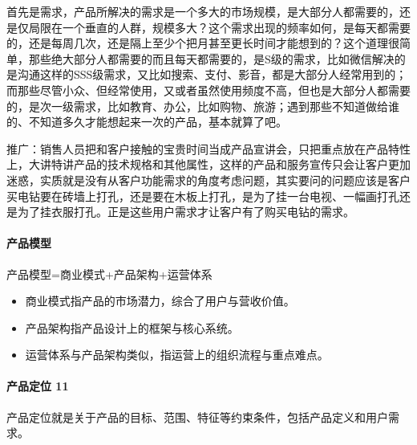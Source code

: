 \documentclass[letterpaper,10pt,english]{sphinxmanual}
\begin{document}
首先是需求，产品所解决的需求是一个多大的市场规模，是大部分人都需要的，还是仅局限在一个垂直的人群，规模多大？这个需求出现的频率如何，是每天都需要的，还是每周几次，还是隔上至少个把月甚至更长时间才能想到的？这个道理很简单，那些绝大部分人都需要的而且每天都需要的，是S级的需求，比如微信解决的是沟通这样的SSS级需求，又比如搜索、支付、影音，都是大部分人经常用到的；而那些尽管小众、但经常使用，又或者虽然使用频度不高，但也是大部分人都需要的，是次一级需求，比如教育、办公，比如购物、旅游；遇到那些不知道做给谁的、不知道多久才能想起来一次的产品，基本就算了吧。

推广：销售人员把和客户接触的宝贵时间当成产品宣讲会，只把重点放在产品特性上，大讲特讲产品的技术规格和其他属性，这样的产品和服务宣传只会让客户更加迷惑，实质就是没有从客户功能需求的角度考虑问题，其实要问的问题应该是客户买电钻要在砖墙上打孔，还是要在木板上打孔，是为了挂一台电视、一幅画打孔还是为了挂衣服打孔。正是这些用户需求才让客户有了购买电钻的需求。


\paragraph{产品模型}
\label{\detokenize{chapter_introduction/Product:id46}}
产品模型=商业模式+产品架构+运营体系%
\begin{footnote}[53]\sphinxAtStartFootnote
{}
%
\end{footnote}
\begin{itemize}
\item {} 
商业模式指产品的市场潜力，综合了用户与营收价值。

\item {} 
产品架构指产品设计上的框架与核心系统。

\item {} 
运营体系与产品架构类似，指运营上的组织流程与重点难点。

\end{itemize}


\paragraph{产品定位 11\sphinxfootnotemark[54]}
\label{\detokenize{chapter_introduction/Product:id47}}%
\begin{footnotetext}[54]\sphinxAtStartFootnote
{}
%
\end{footnotetext}\ignorespaces 
产品定位就是关于产品的目标、范围、特征等约束条件，包括产品定义和用户需求。
\end{document}
